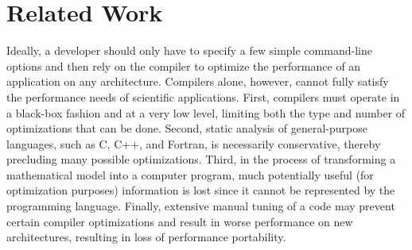 \section{Related Work}
\label{sec:related}

%

Ideally, a developer should only have to specify a few simple
command-line options and then rely on the compiler to optimize the
performance of an application on any architecture. Compilers alone,
however, cannot fully satisfy the performance needs of scientific
applications.  First, compilers must operate in a black-box fashion
and at a very low level, limiting both the type and number of
optimizations that can be done.  Second, static analysis of
general-purpose languages, such as C, C++, and Fortran, is necessarily
conservative, thereby precluding many possible optimizations.  Third,
in the process of transforming a mathematical model into a computer
program, much potentially useful (for optimization purposes)
information is lost since it cannot be represented by the programming
language.  Finally, extensive manual tuning of a code may prevent
certain compiler optimizations and result in worse performance on new
architectures, resulting in loss of performance portability.


